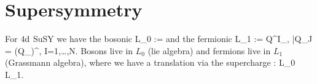 \chapter{Supersymmetry}
For $4\mathrm{d} $ SuSY we have the bosonic 
\bse 
L_0 := 
\ese
and the fermionic
\bse 
L_1 := Q^I_\alpha, \bar{Q}_{J\dot{\alpha}} = (Q_\alpha)^\dagger,\; I=1,\dots,N.
\ese 
Bosons live in $L_0$ (lie algebra) and fermions live in $L_1$ (Grassmann algebra), where we have a translation via the supercharge
\bse 
{} : L_0 \leftrightarrow L_1.
\ese 